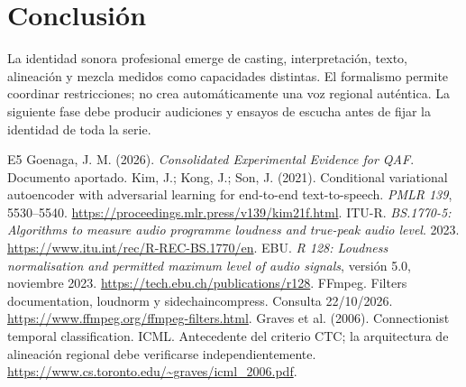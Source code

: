 \section{Conclusión}
La identidad sonora profesional emerge de casting, interpretación, texto, alineación y mezcla medidos como capacidades distintas. El formalismo permite coordinar restricciones; no crea automáticamente una voz regional auténtica. La siguiente fase debe producir audiciones y ensayos de escucha antes de fijar la identidad de toda la serie.

\begin{thebibliography}{E5}
 Goenaga, J. M. (2026). \emph{Consolidated Experimental Evidence for QAF}. Documento aportado.
 Kim, J.; Kong, J.; Son, J. (2021). Conditional variational autoencoder with adversarial learning for end-to-end text-to-speech. \emph{PMLR 139}, 5530--5540. \url{https://proceedings.mlr.press/v139/kim21f.html}.
 ITU-R. \emph{BS.1770-5: Algorithms to measure audio programme loudness and true-peak audio level}. 2023. \url{https://www.itu.int/rec/R-REC-BS.1770/en}.
 EBU. \emph{R 128: Loudness normalisation and permitted maximum level of audio signals}, versión 5.0, noviembre 2023. \url{https://tech.ebu.ch/publications/r128}.
 FFmpeg. Filters documentation, loudnorm y sidechaincompress. Consulta 22/10/2026. \url{https://www.ffmpeg.org/ffmpeg-filters.html}.
 Graves et al. (2006). Connectionist temporal classification. ICML. Antecedente del criterio CTC; la arquitectura de alineación regional debe verificarse independientemente. \url{https://www.cs.toronto.edu/~graves/icml_2006.pdf}.
\end{thebibliography}

